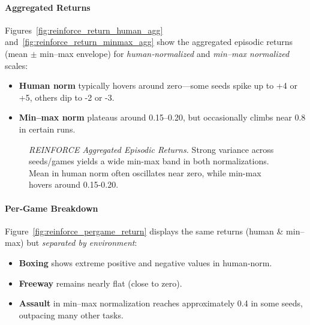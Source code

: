 \paragraph{Aggregated Returns}
Figures~\ref{fig:reinforce_return_human_agg} and~\ref{fig:reinforce_return_minmax_agg} show the aggregated episodic returns (mean $\pm$ min–max envelope) 
for \emph{human‐normalized} and \emph{min--max normalized} scales:
\begin{itemize}
	\item \textbf{Human norm} typically hovers around zero—some seeds spike up to +4 or +5, others dip to -2 or -3.
	\item \textbf{Min--max norm} plateaus around 0.15--0.20, but occasionally climbs near 0.8 in certain runs.
\end{itemize}

\begin{figure}
	\centering
	\quad
	\caption{\textit{REINFORCE Aggregated Episodic Returns.} 
		Strong variance across seeds/games yields a wide min-max band in both normalizations. 
		Mean in human norm often oscillates near zero, while min-max hovers around 0.15-0.20.}
	\label{fig:reinforce_returns_agg}
\end{figure}

\paragraph{Per‐Game Breakdown}
Figure~\ref{fig:reinforce_pergame_return} displays the same returns (human \& min--max) 
but \emph{separated by environment}:
\begin{itemize}
	\item \textbf{Boxing} shows extreme positive and negative values in human‐norm.
	\item \textbf{Freeway} remains nearly flat (close to zero).
	\item \textbf{Assault} in min--max normalization reaches approximately 0.4 in some seeds, outpacing many other tasks.
\end{itemize}


